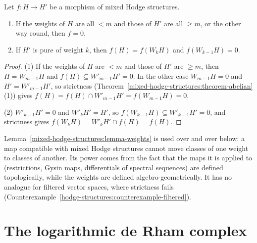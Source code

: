 \begin{lemma}\label{mixed-hodge-structures:lemma-weights}
Let $f \colon H \to H'$ be a morphism of mixed Hodge structures.
\begin{enumerate}
\item If the weights of $H$ are all $< m$ and those of $H'$ are all $\geq m$, or the other way round, then $f = 0$.
\item If $H'$ is pure of weight $k$, then $f(H) = f(W_kH)$ and $f(W_{k-1}H) = 0$.
\end{enumerate}
\end{lemma}

\begin{proof}
(1) If the weights of $H$ are $< m$ and those of $H'$ are $\geq m$, then $H = W_{m-1}H$ and $f(H) \subseteq W'_{m-1}H' = 0$. In the other case $W_{m-1}H = 0$ and $H' = W'_{m-1}H'$, so strictness
(Theorem~\ref{mixed-hodge-structures:theorem-abelian}(1)) gives $f(H) = f(H) \cap W'_{m-1}H' = f(W_{m-1}H) = 0$.

(2) $W'_{k-1}H' = 0$ and $W'_kH' = H'$, so $f(W_{k-1}H) \subseteq W'_{k-1}H' = 0$, and strictness gives $f(W_kH) = W'_kH' \cap f(H) = f(H)$.
\end{proof}

\begin{remark}\label{mixed-hodge-structures:remark-principle}
Lemma~\ref{mixed-hodge-structures:lemma-weights} is used over and over below: a map compatible with mixed Hodge structures cannot move classes of one weight to classes of another. Its power comes from
the fact that the maps it is applied to (restrictions, Gysin maps, differentials of spectral sequences) are defined topologically, while the weights are defined algebro-geometrically. It has no
analogue for filtered vector spaces, where strictness fails (Counterexample~\ref{hodge-structures:counterexample-filtered}).
\end{remark}

\section{The logarithmic de Rham complex}\label{mixed-hodge-structures:section-log-de-rham}

